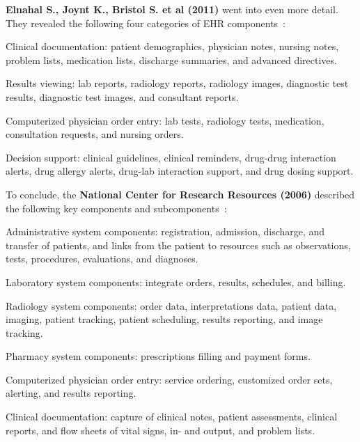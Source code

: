         \noindent \textbf{Elnahal S., Joynt K., Bristol S. et al (2011)} went into even more detail. They revealed the following four categories of EHR components~\cite{Elnahal2011}:
        \vspace{-0.5\topsep}
        \begin{myitemize}
            \item Clinical documentation: patient demographics, physician notes, nursing notes, problem lists, medication lists, discharge summaries, and advanced directives.
            \item Results viewing: lab reports, radiology reports, radiology images, diagnostic test results, diagnostic test images, and consultant reports.
            \item Computerized physician order entry: lab tests, radiology tests, medication, consultation requests, and nursing orders.
            \item Decision support: clinical guidelines, clinical reminders, drug-drug interaction alerts, drug allergy alerts, drug-lab interaction support, and drug dosing support.
        \end{myitemize}

        \noindent To conclude, the \textbf{National Center for Research Resources (2006)} described the following key components and subcomponents~\cite{NCRR2006}:
        \begin{myitemize}
            \item Administrative system components: registration, admission, discharge, and transfer of patients, and links from the patient to resources such as observations, tests, procedures, evaluations, and diagnoses.
            \item Laboratory system components: integrate orders, results, schedules, and billing.
            \item Radiology system components: order data, interpretations data, patient data, imaging, patient tracking, patient scheduling, results reporting, and image tracking.
            \item Pharmacy system components: prescriptions filling and payment forms.
            \item Computerized physician order entry: service ordering, customized order sets, alerting, and results reporting.
            \item Clinical documentation: capture of clinical notes, patient assessments, clinical reports, and flow sheets of vital signs, in- and output, and problem lists.
        \end{myitemize}

